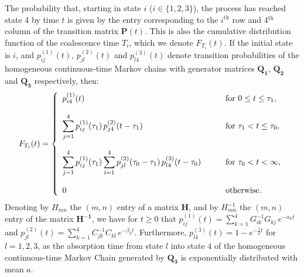 \documentclass[11pt]{article}
\begin{document}
The probability that, starting in state $i$ ($i \in \{1,2,3\}$), the process has reached state 4 by time $t$ is given by the entry corresponding to the $i^{\mathrm{th}}$ row and 4$^{\mathrm{th}}$ column of the transition matrix $\mathbf{P}(t)$. This is also the cumulative distribution function 
of the coalescence time $T_{i}$, which we denote $F_{T_{i}}(t)$. If the initial state is $i$, and $p^{(1)}_{ij}(t)$, $p^{(2)}_{jl}(t)$ and $p^{(3)}_{l4}(t)$ denote transition probabilities of the homogeneous continuous-time Markov chains with generator matrices $\mathbf{Q_{1}}$, $\mathbf{Q_{2}}$ and $\mathbf{Q_{3}}$ respectively, then:
\begin{equation}
\label{eq:cdf_T_1}
F_{T_{i}}(t) = \left\{
  \begin{array}{l l}
   p^{(1)}_{i4}(t) & \quad \text{for }0 \leq t \leq \tau_{1},\\
   \\
    \displaystyle\sum_{j=1}^{4}p^{(1)}_{ij}(\tau_{1})\,p^{(2)}_{j4}(t-\tau_{1}) \quad  & \quad \text{for } \tau_{1} < t \leq \tau_{0},\\
    \\
 \displaystyle\sum_{j=1}^{4} p^{(1)}_{ij}(\tau_{1})\displaystyle\sum_{l=1}^{4}p^{(2)}_{jl}(\tau_{0}-\tau_{1})\,p^{(3)}_{l4}(t-\tau_{0}) \quad& \quad\text{for } \tau_{0} < t< \infty,\\
   \\
0\quad &\quad \text{otherwise}.
  \end{array} \right.
\end{equation}
Denoting by $H_{mn}$ the $(m,n)$ entry of a matrix $\mathbf{H}$, and by $H^{-1}_{mn}$ the $(m,n)$ entry of the matrix $\mathbf{H^{-1}}$, we have for $t \geq 0$ that $p^{(1)}_{ij}(t)=\sum_{k=1}^{4} G_{ik}^{-1}G_{kj}\,e^{-\alpha_{k}t}$ and $p^{(2)}_{jl}(t)=\sum_{k=1}^{4} C_{jk}^{-1}C_{kl}\,e^{-\beta_{k}t}$. 
Furthermore, $p^{(3)}_{l4}(t)= 1-e^{-\frac{1}{a}t}$ for $l=1,2,3$, as the absorption time from state $l$ into state $4$ of the homogeneous continuous-time Markov Chain generated by $\mathbf{Q_{3}}$ is exponentially distributed with mean $a$. 
\end{document}
